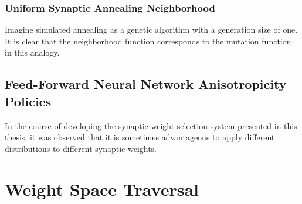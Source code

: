 \documentclass[11pt]{afthesis}
\begin{document}
	\subsubsection{Uniform Synaptic Annealing Neighborhood}

	Imagine simulated annealing as a genetic algorithm with a generation size of one. It is clear that the neighborhood function corresponds to the mutation function in this analogy. 
	
	
	
	\subsection{Feed-Forward Neural Network Anisotropicity Policies}
	\label{scn:ffnn_anisotropicity}
	In the course of developing the synaptic weight selection system presented in this thesis, it was observed that it is sometimes advantageous to apply different distributions to different synaptic weights. 
	
	
	\section{Weight Space Traversal}
	
\end{document}
